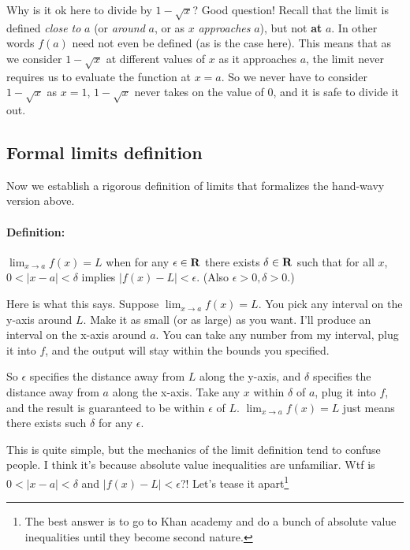 \vs

Why is it ok here to divide by $1-\sqrt{x}$? Good question! Recall
that the limit is defined \textit{close to} $a$ (or \textit{around}
$a$, or as $x$ \textit{approaches} $a$), but not \textbf{at} $a$. In
other words $f(a)$ need not even be defined (as is the case here).
This means that as we consider $1-\sqrt{x}$ at different values of $x$
as it approaches $a$, the limit never requires us to evaluate the
function at $x=a$. So we never have to consider $1-\sqrt{x}$ as $x=1$,
$1-\sqrt{x}$ never takes on the value of $0$, and it is safe to divide
it out.

\subsection{Formal limits definition}

Now we establish a rigorous definition of limits that formalizes the
hand-wavy version above.

\paragraph{Definition:} $\lim_{x\to a}f(x)=L$ when for any
$\epsilon\in\mathbf{R}$ there exists $\delta\in\mathbf{R}$ such that for all $x$,
$0<|x-a|<\delta$ implies $|f(x)-L|<\epsilon$. (Also $\epsilon>0, \delta>0$.)

\vs

Here is what this says. Suppose $\lim_{x\to a}f(x)=L$. You pick any
interval on the y-axis around $L$. Make it as small (or as large) as
you want. I'll produce an interval on the x-axis around $a$. You can
take any number from my interval, plug it into $f$, and the output
will stay within the bounds you specified.

\vs

So $\epsilon$ specifies the distance away from $L$ along the y-axis, and
$\delta$ specifies the distance away from $a$ along the x-axis. Take any
$x$ within $\delta$ of $a$, plug it into $f$, and the result is guaranteed
to be within $\epsilon$ of $L$. $\lim_{x\to a}f(x)=L$ just means there exists
such $\delta$ for any $\epsilon$.

\vs

This is quite simple, but the mechanics of the limit definition tend
to confuse people. I think it's because absolute value inequalities
are unfamiliar. Wtf is $0<|x-a|<\delta$ and $|f(x)-L|<\epsilon$?! Let's tease it
apart\footnote{The best answer is to go to Khan academy and do a bunch
  of absolute value inequalities until they become second nature.}


